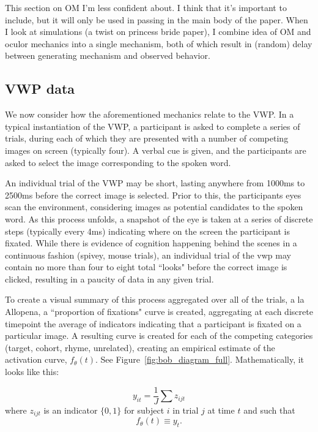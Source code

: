 \documentclass{article}
\begin{document}
This section on OM I'm less confident about. I think that it's important to include, but it will only be used in passing in the main body of the paper. When I look at simulations (a twist on princess bride paper), I combine idea of OM and oculor mechanics into a single mechanism, both of which result in (random) delay between generating mechanism and observed behavior.

\subsection{VWP data}


We now consider how the aforementioned mechanics relate to the VWP. In a typical instantiation of the VWP, a participant is asked to complete a series of trials, during each of which they are presented with a number of competing images on screen (typically four). A verbal cue is given, and the participants are asked to select the image corresponding to the spoken word.

An individual trial of the VWP may be short, lasting anywhere from 1000ms to 2500ms before the correct image is selected. Prior to this, the participants eyes scan the environment, considering images as potential candidates to the spoken word. As this process unfolds, a snapshot of the eye is taken at a series of discrete steps (typically every 4ms) indicating where on the screen the participant is fixated. While there is evidence of cognition happening behind the scenes in a continuous fashion (spivey, mouse trials), an individual trial of the vwp may contain no more than four to eight total ``looks" before the correct image is clicked, resulting in a paucity of data in any given trial.

To create a visual summary of this process aggregated over all of the trials, a la Allopena, a ``proportion of fixations" curve is created, aggregating at each discrete timepoint the average of indicators indicating that a participant is fixated on a particular image. A resulting curve is created for each of the competing categories (target, cohort, rhyme, unrelated), creating an empirical estimate of the activation curve, $f_{\theta}(t)$. See Figure~\ref{fig:bob_diagram_full}. Mathematically, it looks like this:

\begin{equation}
y_{it} = \frac1J \sum z_{ijt}
\end{equation}
where $z_{ijt}$ is an indicator $\{0, 1\}$ for subject $i$ in trial $j$ at time $t$ and such that
\begin{equation}
f_{\theta}(t) \equiv y_t.
\end{equation}
\end{document}
